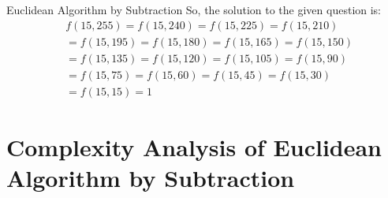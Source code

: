 \documentclass[8pt]{beamer}
\begin{document}
\begin{frame}[allowframebreaks]{Euclidean Algorithm by Subtraction}
So, the solution to the given question is:
\[
\begin{split}
&f(15,255) = f(15,240) = f(15,225) = f(15,210)\\
&= f(15,195) = f(15,180) = f(15,165) = f(15,150)\\
&= f(15,135) = f(15,120) = f(15,105) = f(15,90)\\
&= f(15,75) = f(15,60) = f(15,45) = f(15,30)\\
&= f(15,15) = 1
\end{split}\]

\end{frame}

\section{Complexity Analysis of Euclidean Algorithm by Subtraction}
\end{document}
